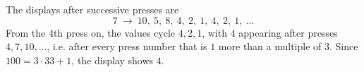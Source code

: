 The displays after successive presses are
\[7\ \to\ 10,\ 5,\ 8,\ 4,\ 2,\ 1,\ 4,\ 2,\ 1,\ \dots\]
From the $4$th press on, the values cycle $4,2,1$, with $4$ appearing after presses $4,7,10,\dots$, i.e. after every press number that is $1$ more than a multiple of $3$. Since $100=3\cdot33+1$, the display shows $\boxed{4}$.
